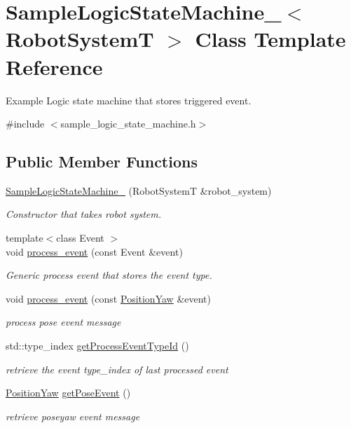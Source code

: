 \hypertarget{classSampleLogicStateMachine__}{\section{Sample\-Logic\-State\-Machine\-\_\-$<$ Robot\-System\-T $>$ Class Template Reference}
\label{classSampleLogicStateMachine__}
}


Example Logic state machine that stores triggered event.  




{\ttfamily \#include $<$sample\-\_\-logic\-\_\-state\-\_\-machine.\-h$>$}

\subsection*{Public Member Functions}
\begin{DoxyCompactItemize}
\item 
\hyperlink{classSampleLogicStateMachine___a5450901d1fdbedd6368ea302322a5fb6}{Sample\-Logic\-State\-Machine\-\_\-} (Robot\-System\-T \&robot\-\_\-system)
\begin{DoxyCompactList}\small\item\em Constructor that takes robot system. \end{DoxyCompactList}\item 
{\footnotesize template$<$class Event $>$ }\\void \hyperlink{classSampleLogicStateMachine___af577b426ec630d48148ed6aab393b43e}{process\-\_\-event} (const Event \&event)
\begin{DoxyCompactList}\small\item\em Generic process event that stores the event type. \end{DoxyCompactList}\item 
void \hyperlink{classSampleLogicStateMachine___a60ca43f8a484f1ab56669d0485479c47}{process\-\_\-event} (const \hyperlink{structPositionYaw}{Position\-Yaw} \&event)
\begin{DoxyCompactList}\small\item\em process pose event message \end{DoxyCompactList}\item 
std\-::type\-\_\-index \hyperlink{classSampleLogicStateMachine___a469a3cdffcce57a12c5b7890410b63e8}{get\-Process\-Event\-Type\-Id} ()
\begin{DoxyCompactList}\small\item\em retrieve the event type\-\_\-index of last processed event \end{DoxyCompactList}\item 
\hyperlink{structPositionYaw}{Position\-Yaw} \hyperlink{classSampleLogicStateMachine___a254ed914235117e9ffaa5ba8614335cb}{get\-Pose\-Event} ()
\begin{DoxyCompactList}\small\item\em retrieve poseyaw event message \end{DoxyCompactList}\end{DoxyCompactItemize}
